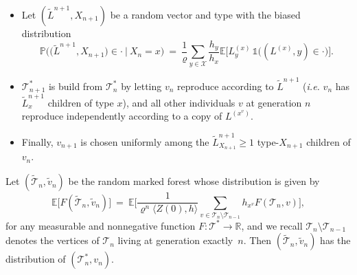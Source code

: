 \begin{refsegment}
\begin{itemize}
\begin{itemize}
    \item Let $(\widetilde{L}^{n+1}, X_{n+1})$ be a random vector and type with the biased distribution 
      \[
  \mathbb{P}\Big(\big(\widetilde{L}^{n+1}, X_{n+1}\big)\in \cdot\ \vert\   X_{n}=x \Big)\ =\ \frac{1}{\varrho} \sum_{y\in \mathcal{X}}\frac{h_y}{ h_x}\mathbb{E}\Big[L^{(x)}_{y}\, \mathds{1}\big((L^{(x)},y)\in \cdot \big) \Big].
  \]
  
    \item $\mathcal{T}^{*}_{ n+1}$ is build from $\mathcal{T}^{*}_{
        n}$ by letting $v_n$ reproduce according to
      $\widetilde{L}^{n+1}$ (\textit{i.e.} $v_n$ has $\widetilde{L}^{n+1}_x$ children of type $x$), and all other individuals $v$ at generation $n$ reproduce independently according to a copy of $L^{(x^v)}$.
    
    \item Finally, $v_{n+1}$ is chosen uniformly among the $\widetilde{L}^{n+1}_{X_{n+1}}\geq 1$ type-$X_{n+1}$ children of $v_n$.
  \end{itemize}
\end{itemize}

\begin{lem}\label{lem:spinal-change-of-measure}
  Let $(\widetilde{\mathcal{T}}_{ n}, \tilde{v}_n)$ be the random marked forest whose distribution is given by
  \[
    \mathbb{E}\big[F(\widetilde{\mathcal{T}}_{ n},\tilde{v}_n)\big]\ =\ \mathbb{E}\bigg[\frac{1}{\varrho^n \langle Z(0),h\rangle}\sum_{v\in \mathcal{T}_{n}\setminus \mathcal{T}_{n-1}} h_{x^v}F(\mathcal{T}_{ n},v)\bigg],
  \]
  for any measurable and nonnegative function $F:\mathscr{T}^*\to \mathbb{R}$, and we recall $\mathcal{T}_{n}\setminus \mathcal{T}_{n-1}$ denotes the vertices of $\mathcal{T}_{n}$ living at generation exactly~$n$.
  Then $(\widetilde{\mathcal{T}}_{ n}, \tilde{v}_n)$ has the distribution of $(\mathcal{T}^*_{ n}, v_n)$.
\end{lem}


\end{refsegment}
